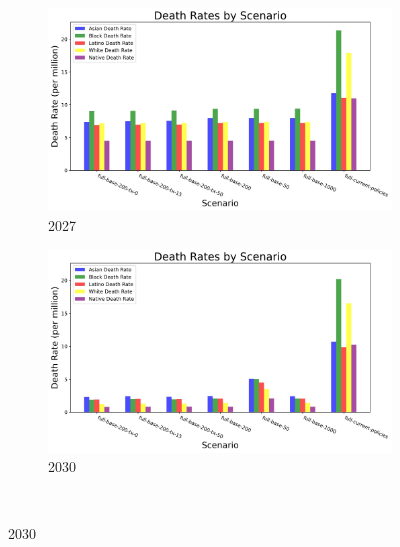 \documentclass[a4paper]{article}
\theoremstyle{definition}
\theoremstyle{plain}
\begin{document}
\begin{figure}
    \centering
    \begin{subfigure}[b]{0.49\textwidth}
        \includegraphics[width=\textwidth]{Figures/Output/Compare_scenarios_all-scenarios_2027_GenX.jpg}
        \caption{2027}
        \label{Subfig1}
    \end{subfigure}
    \hfill
    \begin{subfigure}[b]{0.49\textwidth}
        \includegraphics[width=\textwidth]{Figures/Output/Compare_scenarios_all-scenarios_2030_GenX.jpg}
        \caption{2030}
        \label{Subfig2}
    \end{subfigure}\\


\end{figure}
\end{document}
